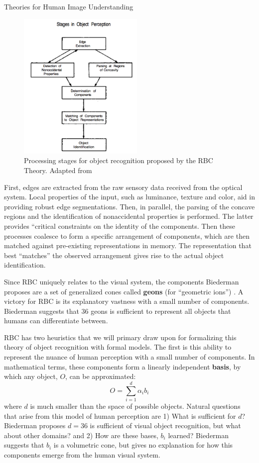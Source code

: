 \documentclass[12pt]{pom_thesis}
\begin{document}
\begin{chapter}{Theories for Human Image Understanding}
\begin{figure}
	\label{fig: rbc}
	\centering
	\includegraphics[width=6cm]{rbc}
	\caption{Processing stages for object recognition proposed by the RBC Theory. Adapted from \cite{biederman1987recognition}}
\end{figure}
First, edges are extracted from the raw sensory data received from the optical system. Local properties of the input, such as luminance, texture and color, aid in providing robust edge segmentations. Then, in parallel, the parsing of the concave regions and the identification of nonaccidental properties is performed. The latter provides ``critical constraints on the identity of the components. Then these processes coalesce to form a specific arrangement of components, which are then matched against pre-existing representations in memory. The representation that best ``matches'' the observed arrangement gives rise to the actual object identification. 

Since RBC uniquely relates to the visual system, the components Biederman proposes are a set of generalized cones called \textbf{geons} (for ``geometric ions'') \cite{biederman1987recognition}.
A victory for RBC is its explanatory vastness with a small number of components. Biederman suggests that 36 geons is sufficient to represent all objects that humans can differentiate between. 

RBC has two heuristics that we will primary draw upon for formalizing this theory of object recognition with formal models. The first is this ability to represent the nuance of human perception with a small number of components. In mathematical terms, these components form a linearly independent \textbf{basis}, by which any object, $O$, can be approximated:
\begin{equation} \label{eq:1}O = \sum_{i=1}^d \alpha_i b_i\end{equation}
where $d$ is much smaller than the space of possible objects. Natural questions that arise from this model of human perception are 1) What is sufficient for $d$? Biederman proposes $d=36$ is sufficient of visual object recognition, but what about other domains? and 2) How are these bases, $b_i$ learned? Biederman suggests that $b_i$ is a volumetric cone, but gives no explanation for how this components emerge from the human visual system. 


\end{chapter}
\end{document}
